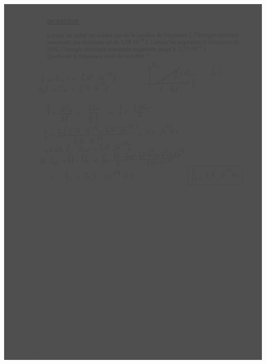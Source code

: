 {\includegraphics[width=17.498cm,height=24.13cm]{Pictures/10000001000002570000033B637F3053717E0CEA.png}

}
